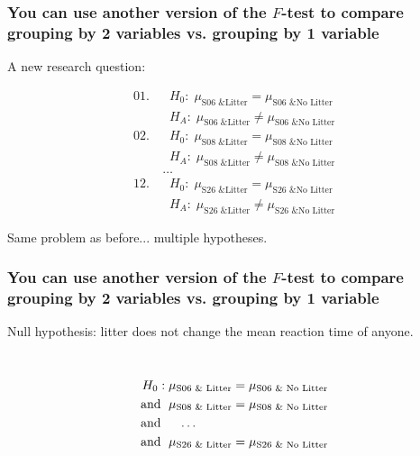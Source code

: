 \documentclass[slidestop,compress,mathserif,12pt,t,professionalfonts,xcolor=table]{beamer}
\newcommand{\ftest}{You can use another version of the $F$-test to compare grouping by 2 variables vs. grouping by 1 variable}
\begin{document}
\begin{frame}
  \frametitle{\ftest}

A new research question:


{\small
\begin{align*}
01.\ &  \; \; H_0: \; \mu_{\text{S06 \& Litter}} = \mu_{\text{S06 \& No Litter}} \\
     &  \; \; H_A: \; \mu_{\text{S06 \& Litter}} \neq \mu_{\text{S06 \& No Litter}} \\
02.\ &  \; \; H_0: \; \mu_{\text{S08 \& Litter}} = \mu_{\text{S08 \& No Litter}} \\
     &  \; \; H_A: \; \mu_{\text{S08 \& Litter}} \neq \mu_{\text{S08 \& No Litter}} \\
     & \ldots \\
12.\ &  \; \; H_0: \; \mu_{\text{S26 \& Litter}} = \mu_{\text{S26 \& No Litter}} \\
     &  \; \; H_A: \; \mu_{\text{S26 \& Litter}} \neq \mu_{\text{S26 \& No Litter}} 
\end{align*}
}

Same problem as before... multiple hypotheses.

\end{frame}


\begin{frame}
  \frametitle{\ftest}

Null hypothesis: litter does not change the mean reaction time of anyone.

\hfill \\


{\small
\begin{align*}
H_0: \; & \mu_{\text{S06 \& Litter}} = \mu_{\text{S06 \& No Litter}} \\
\textmd{and } \; & \mu_{\text{S08 \& Litter}} = \mu_{\text{S08 \& No Litter}} \\
\textmd{and } \; & \; \; \; \ldots \\
\textmd{and } \; & \mu_{\text{S26 \& Litter}} = \mu_{\text{S26 \& No Litter}} \\
\end{align*}
}

\end{frame}


\end{document}
